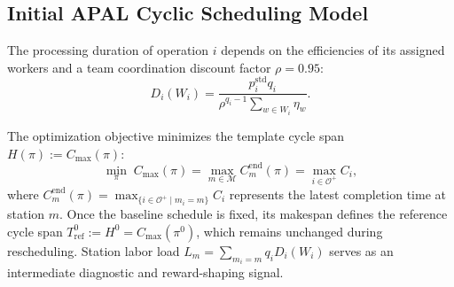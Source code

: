 \documentclass[journal,10pt]{IEEEtran}
\begin{document}
\subsection{Initial APAL Cyclic Scheduling Model}

The processing duration of operation $i$ depends on the efficiencies of its assigned workers and a team coordination discount factor $\rho=0.95$:
\begin{equation}\label{eq:duration}
D_i(W_i) = \frac{p_i^{\mathrm{std}} q_i}{\rho^{q_i-1} \sum_{w\in W_i} \eta_w}.
\end{equation}

The optimization objective minimizes the template cycle span $H(\pi):=C_{\max}(\pi)$:
\begin{equation}\label{eq:cmax}
\min_{\pi}\; C_{\max}(\pi) = \max_{m\in\mathcal{M}} C_m^{\mathrm{end}}(\pi) = \max_{i\in\mathcal{O}^+} C_i,
\end{equation}
where $C_m^{\mathrm{end}}(\pi)=\max_{\{i\in\mathcal{O}^+\mid m_i=m\}} C_i$ represents the latest completion time at station $m$. Once the baseline schedule is fixed, its makespan defines the reference cycle span $T_{\mathrm{ref}}^0:=H^0=C_{\max}(\pi^0)$, which remains unchanged during rescheduling. Station labor load $L_m=\sum_{m_i=m} q_i D_i(W_i)$ serves as an intermediate diagnostic and reward-shaping signal.
\end{document}

